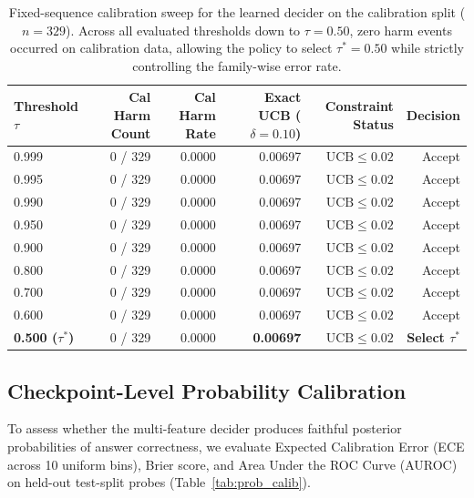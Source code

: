 \documentclass[11pt]{article}
\begin{document}
\begin{table}[ht]
\centering
\small
\begin{tabular}{lrrrrr}
\toprule
\textbf{Threshold $\tau$} & \textbf{Cal Harm Count} & \textbf{Cal Harm Rate} & \textbf{Exact UCB} ($\delta=0.10$) & \textbf{Constraint Status} & \textbf{Decision} \\
\midrule
0.999 & 0 / 329 & 0.0000 & 0.00697 & $\mathrm{UCB} \le 0.02$ & Accept \\
0.995 & 0 / 329 & 0.0000 & 0.00697 & $\mathrm{UCB} \le 0.02$ & Accept \\
0.990 & 0 / 329 & 0.0000 & 0.00697 & $\mathrm{UCB} \le 0.02$ & Accept \\
0.950 & 0 / 329 & 0.0000 & 0.00697 & $\mathrm{UCB} \le 0.02$ & Accept \\
0.900 & 0 / 329 & 0.0000 & 0.00697 & $\mathrm{UCB} \le 0.02$ & Accept \\
0.800 & 0 / 329 & 0.0000 & 0.00697 & $\mathrm{UCB} \le 0.02$ & Accept \\
0.700 & 0 / 329 & 0.0000 & 0.00697 & $\mathrm{UCB} \le 0.02$ & Accept \\
0.600 & 0 / 329 & 0.0000 & 0.00697 & $\mathrm{UCB} \le 0.02$ & Accept \\
\textbf{0.500 ($\tau^*$)} & 0 / 329 & 0.0000 & \textbf{0.00697} & $\mathrm{UCB} \le 0.02$ & \textbf{Select $\tau^*$} \\
\bottomrule
\end{tabular}
\caption{Fixed-sequence calibration sweep for the learned decider on the calibration split ($n=329$). Across all evaluated thresholds down to $\tau=0.50$, zero harm events occurred on calibration data, allowing the policy to select $\tau^*=0.50$ while strictly controlling the family-wise error rate.}
\label{tab:cal_sweep}
\end{table}

\subsection{Checkpoint-Level Probability Calibration}
To assess whether the multi-feature decider produces faithful posterior probabilities of answer correctness, we evaluate Expected Calibration Error (ECE across 10 uniform bins), Brier score, and Area Under the ROC Curve (AUROC) on held-out test-split probes (Table~\ref{tab:prob_calib}).
\end{document}
